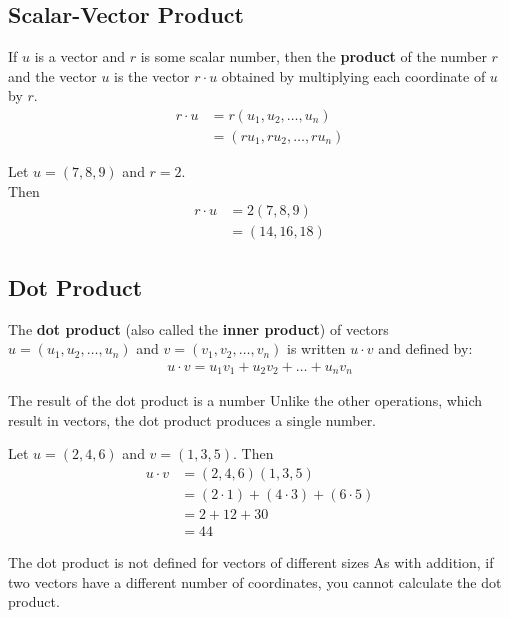 \documentclass[../notes.tex]{subfiles}
\begin{document}
			\subsection{Scalar-Vector Product}
				If $u$ is a vector and $r$ is some scalar number, then the \textbf{product} of the number $r$ and the vector $u$ is the vector $r \cdot u$ obtained by multiplying each coordinate of $u$ by $r$.
				\begin{align*}
					r\cdot u &= r(u_{1}, u_{2}, \ldots, u_{n})\\
					&= (ru_{1}, ru_{2}, \ldots, ru_{n})
				\end{align*}
				\begin{example}
					Let $u = (7, 8, 9)$ and $r = 2$.\\
					Then
					\begin{align*}
						r \cdot u &= 2(7, 8, 9)\\
						&= (14, 16, 18)
					\end{align*}
				\end{example}
			\subsection{Dot Product}
				The \textbf{dot product} (also called the \textbf{inner product}) of vectors $u = (u_{1}, u_{2}, \ldots, u_{n})$ and $v = (v_{1}, v_{2}, \ldots, v_{n})$ is written $u \cdot v$ and defined by:
				\begin{align*}
					u \cdot v = u_{1}v_{1} + u_{2}v_{2} + \ldots + u_{n}v_{n}
				\end{align*}
				\begin{sidenote}{The result of the dot product is a number}
					Unlike the other operations, which result in vectors, the dot product produces a single number.
				\end{sidenote}
				\begin{example}
					Let $u = (2, 4, 6)$ and $v = (1, 3, 5)$. Then
					\begin{align*}
						u \cdot v &= (2, 4, 6)(1, 3, 5)\\
						&= (2 \cdot 1) + (4 \cdot 3) + (6 \cdot 5)\\
						&= 2 + 12 + 30\\
						&= 44
					\end{align*}
				\end{example}
				\begin{sidenote}{The dot product is not defined for vectors of different sizes}
					As with addition, if two vectors have a different number of coordinates, you cannot calculate the dot product.
				\end{sidenote}
		\pagebreak
\end{document}
